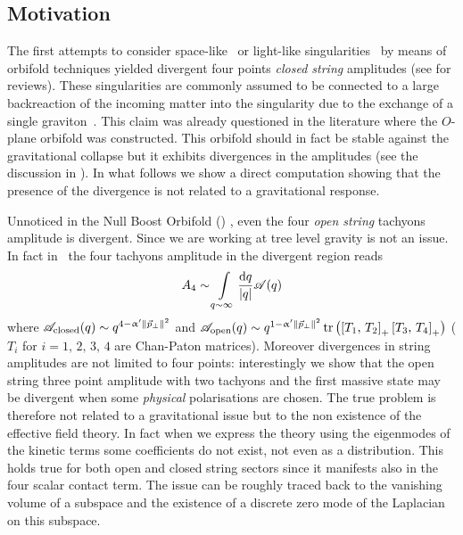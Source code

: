 \subsection{Motivation}

The first attempts to consider space-like~\cite{Craps:2002:StringPropagationPresence} or light-like singularities~\cite{Liu:2002:StringsTimeDependentOrbifold,Liu:2002:StringsTimeDependentOrbifolds} by means of orbifold  techniques yielded divergent four points \emph{closed string} amplitudes (see \cite{Cornalba:2004:TimedependentOrbifoldsString,Craps:2006:BigBangModels} for reviews).
These singularities are commonly assumed to be connected to a large backreaction of the incoming matter into the singularity due to the exchange of a single graviton~\cite{Berkooz:2003:CommentsCosmologicalSingularities,Horowitz:2002:InstabilitySpacelikeNull}.
This claim was already questioned in the literature where the $O$-plane orbifold was constructed.
This orbifold should in fact be stable against the gravitational collapse but it exhibits divergences in the amplitudes (see the discussion in \cite{Cornalba:2004:TimedependentOrbifoldsString}).
In what follows we show a direct computation showing that the presence of the divergence is not related to a gravitational response.

Unnoticed in the Null Boost Orbifold (\nbo) \cite{Liu:2002:StringsTimeDependentOrbifold}, even the four \emph{open string} tachyons amplitude is divergent.
Since we are working at tree level gravity is not an issue.
In fact in~\cite{Liu:2002:StringsTimeDependentOrbifold} the four tachyons amplitude in the divergent region reads
\begin{equation}
  A_4 \sim \int\limits_{q \sim \infty} \frac{\dd{q}}{\abs{q}} \mathscr{A}( q )
\end{equation}
where $\mathscr{A}_{\text{closed}}( q ) \sim q^{4 - \upalpha' \norm{\vec{p}_{\perp}}^2}$ and $\mathscr{A}_{\text{open}}( q ) \sim q^{1 - \upalpha' \norm{\vec{p}_{\perp}}^2} \tr\qty( \left[ T_1,\, T_2 \right]_+ \left[ T_3,\, T_4 \right]_+ )$ ($T_i$ for $i = 1,\, 2,\, 3,\, 4$ are Chan-Paton matrices).
Moreover divergences in string amplitudes are not limited to four points: interestingly we show that the open string three point amplitude with two tachyons and the first massive state may be divergent when some \emph{physical} polarisations are chosen.
The true problem is therefore not related to a gravitational issue but to the non existence of the effective field theory.
In fact when we express the theory using the eigenmodes of the kinetic terms some coefficients do not exist, not even as a distribution.
This holds true for both open and closed string sectors since it manifests also in the four scalar contact term.
The issue can be roughly traced back to the vanishing volume of a subspace and the existence of a discrete zero mode of the Laplacian on this subspace.

